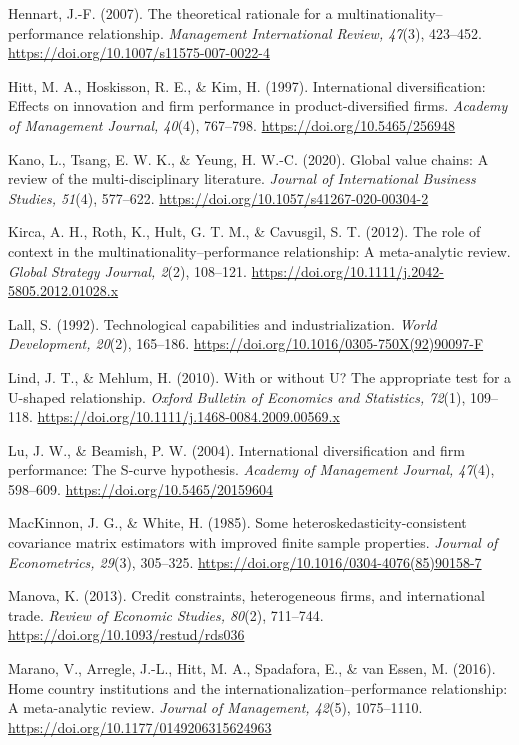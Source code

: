 \documentclass[12pt,a4paper]{article}
\begin{document}
Hennart, J.-F. (2007). The theoretical rationale for a
multinationality--performance relationship. \emph{Management
International Review, 47}(3), 423--452.
\url{https://doi.org/10.1007/s11575-007-0022-4}

Hitt, M. A., Hoskisson, R. E., \& Kim, H. (1997). International
diversification: Effects on innovation and firm performance in
product-diversified firms. \emph{Academy of Management Journal, 40}(4),
767--798. \url{https://doi.org/10.5465/256948}

Kano, L., Tsang, E. W. K., \& Yeung, H. W.-C. (2020). Global value
chains: A review of the multi-disciplinary literature. \emph{Journal of
International Business Studies, 51}(4), 577--622.
\url{https://doi.org/10.1057/s41267-020-00304-2}

Kirca, A. H., Roth, K., Hult, G. T. M., \& Cavusgil, S. T. (2012). The
role of context in the multinationality--performance relationship: A
meta-analytic review. \emph{Global Strategy Journal, 2}(2), 108--121.
\url{https://doi.org/10.1111/j.2042-5805.2012.01028.x}

Lall, S. (1992). Technological capabilities and industrialization.
\emph{World Development, 20}(2), 165--186.
\url{https://doi.org/10.1016/0305-750X(92)90097-F}

Lind, J. T., \& Mehlum, H. (2010). With or without U? The appropriate
test for a U-shaped relationship. \emph{Oxford Bulletin of Economics and
Statistics, 72}(1), 109--118.
\url{https://doi.org/10.1111/j.1468-0084.2009.00569.x}

Lu, J. W., \& Beamish, P. W. (2004). International diversification and
firm performance: The S-curve hypothesis. \emph{Academy of Management
Journal, 47}(4), 598--609. \url{https://doi.org/10.5465/20159604}

MacKinnon, J. G., \& White, H. (1985). Some
heteroskedasticity-consistent covariance matrix estimators with improved
finite sample properties. \emph{Journal of Econometrics, 29}(3),
305--325. \url{https://doi.org/10.1016/0304-4076(85)90158-7}

Manova, K. (2013). Credit constraints, heterogeneous firms, and
international trade. \emph{Review of Economic Studies, 80}(2), 711--744.
\url{https://doi.org/10.1093/restud/rds036}

Marano, V., Arregle, J.-L., Hitt, M. A., Spadafora, E., \& van Essen, M.
(2016). Home country institutions and the
internationalization--performance relationship: A meta-analytic review.
\emph{Journal of Management, 42}(5), 1075--1110.
\url{https://doi.org/10.1177/0149206315624963}
\end{document}

